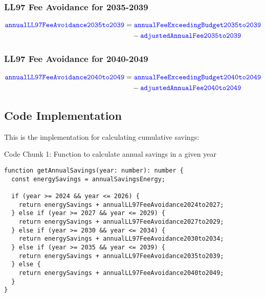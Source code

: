 \documentclass{article}
\newcommand{\code}[1]{\textcolor{blue}{\texttt{#1}}}
\begin{document}
\subsubsection{LL97 Fee Avoidance for 2035-2039}

\begin{align}
\code{annualLL97FeeAvoidance2035to2039} &= \code{annualFeeExceedingBudget2035to2039} \nonumber \\
&\quad - \code{adjustedAnnualFee2035to2039}
\end{align}

\subsubsection{LL97 Fee Avoidance for 2040-2049}

\begin{align}
\code{annualLL97FeeAvoidance2040to2049} &= \code{annualFeeExceedingBudget2040to2049} \nonumber \\
&\quad - \code{adjustedAnnualFee2040to2049}
\end{align}

\newpage
\subsection{Code Implementation}

This is the implementation for calculating cumulative savings:

\bigskip

Code Chunk 1: Function to calculate annual savings in a given year
\begin{lstlisting}
function getAnnualSavings(year: number): number {
  const energySavings = annualSavingsEnergy;
  
  if (year >= 2024 && year <= 2026) {
    return energySavings + annualLL97FeeAvoidance2024to2027;
  } else if (year >= 2027 && year <= 2029) {
    return energySavings + annualLL97FeeAvoidance2027to2029;
  } else if (year >= 2030 && year <= 2034) {
    return energySavings + annualLL97FeeAvoidance2030to2034;
  } else if (year >= 2035 && year <= 2039) {
    return energySavings + annualLL97FeeAvoidance2035to2039;
  } else {
    return energySavings + annualLL97FeeAvoidance2040to2049;
  }
}
\end{lstlisting}
\end{document}
